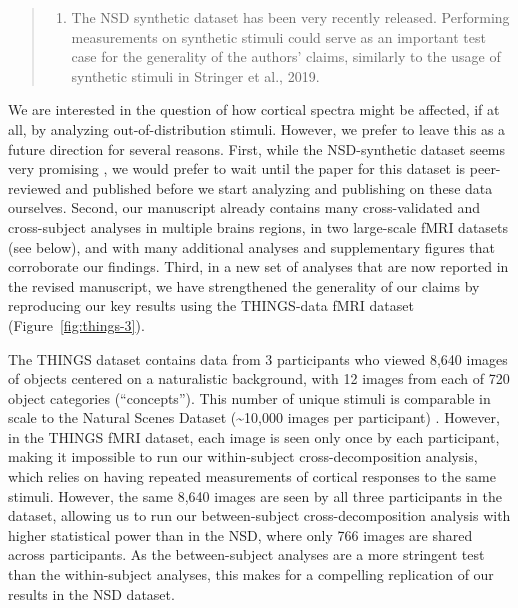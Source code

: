 \documentclass[10pt]{article}
\providecommand{\tightlist}{\setlength{\itemsep}{0pt}\setlength{\parskip}{0pt}}
\begin{document}
\begin{quote}
\begin{enumerate}
\def\labelenumi{\arabic{enumi}.}
\setcounter{enumi}{3}
\tightlist
\item
  The NSD synthetic dataset has been very recently released. Performing measurements on synthetic stimuli could serve as an important test case for the generality of the authors' claims, similarly to the usage of synthetic stimuli in Stringer et al., 2019.
\end{enumerate}
\end{quote}

We are interested in the question of how cortical spectra might be affected, if at all, by analyzing out-of-distribution stimuli. However, we prefer to leave this as a future direction for several reasons. First, while the NSD-synthetic dataset seems very promising \autocite{Gifford2025}, we would prefer to wait until the paper for this dataset is peer-reviewed and published before we start analyzing and publishing on these data ourselves. Second, our manuscript already contains many cross-validated and cross-subject analyses in multiple brains regions, in two large-scale fMRI datasets (see below), and with many additional analyses and supplementary figures that corroborate our findings. Third, in a new set of analyses that are now reported in the revised manuscript, we have strengthened the generality of our claims by reproducing our key results using the THINGS-data fMRI dataset \autocite{Hebart2023} (Figure~\ref{fig:things-3}).

The THINGS dataset contains data from 3 participants who viewed 8,640 images of objects centered on a naturalistic background, with 12 images from each of 720 object categories (``concepts''). This number of unique stimuli is comparable in scale to the Natural Scenes Dataset (\textasciitilde10,000 images per participant) \autocite{Allen2021}. However, in the THINGS fMRI dataset, each image is seen only once by each participant, making it impossible to run our within-subject cross-decomposition analysis, which relies on having repeated measurements of cortical responses to the same stimuli. However, the same 8,640 images are seen by all three participants in the dataset, allowing us to run our between-subject cross-decomposition analysis with higher statistical power than in the NSD, where only 766 images are shared across participants. As the between-subject analyses are a more stringent test than the within-subject analyses, this makes for a compelling replication of our results in the NSD dataset.
\end{document}
